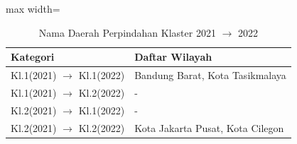 \begin{table}[H]
\centering
\caption{Nama Daerah Perpindahan Klaster 2021 \(\rightarrow\) 2022} \label{tab:transname2021x2022}
\begin{adjustbox}{max width=\textwidth}
\begin{tabular}{|p{4cm}|p{10cm}|}
\hline
\textbf{Kategori} & \textbf{Daftar Wilayah} \\
\hline
Kl.1(2021) \(\rightarrow\) Kl.1(2022) & Bandung Barat, Kota Tasikmalaya \\
\hline
Kl.1(2021) \(\rightarrow\) Kl.2(2022) & - \\
\hline
Kl.2(2021) \(\rightarrow\) Kl.1(2022) & - \\
\hline
Kl.2(2021) \(\rightarrow\) Kl.2(2022) & Kota Jakarta Pusat, Kota Cilegon \\
\hline
\end{tabular}
\end{adjustbox}
\end{table}